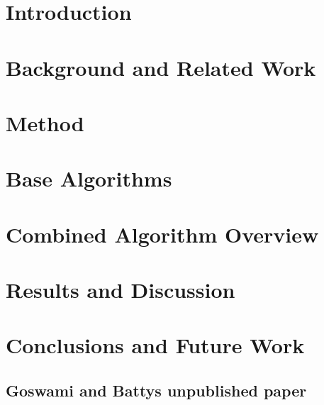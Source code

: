 \documentclass[a4paper,oneside]{bth}
\begin{document}
\cleardoublepage
\pagestyle{headings}

\chapter{Introduction}


\chapter{Background and Related Work}


\chapter{Method}


\chapter{Base Algorithms}


\chapter{Combined Algorithm Overview}


\chapter{Results and Discussion}


\chapter{Conclusions and Future Work}



\nocite{*}


\begin{appendices}
\chapter{Goswami and Battys unpublished paper}

\end{appendices}
\end{document}
